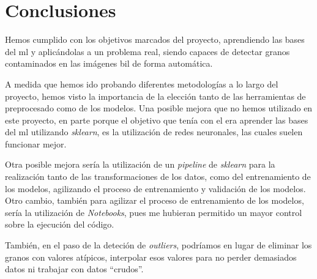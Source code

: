 \section{Conclusiones}

Hemos cumplido con los objetivos marcados del proyecto, aprendiendo las bases del \gls{ml} y aplicándolas a un problema real, siendo capaces de detectar granos contaminados en las imágenes \gls{bil} de forma automática.

A medida que hemos ido probando diferentes metodologías a lo largo del proyecto, hemos visto la importancia de la elección tanto de las herramientas de preprocesado como de los modelos.
Una posible mejora que no hemos utilizado en este proyecto, en parte porque el objetivo que tenía con el era aprender las bases del \gls{ml} utilizando \textit{sklearn}, es la utilización de redes neuronales, las cuales suelen funcionar mejor.

Otra posible mejora sería la utilización de un \textit{pipeline} de \textit{sklearn} para la realización tanto de las transformaciones de los datos, como del entrenamiento de los modelos, agilizando el proceso de entrenamiento y validación de los modelos. Otro cambio, también para agilizar el proceso de entrenamiento de los modelos, sería la utilización de \textit{Notebooks}, pues me hubieran permitido un mayor control sobre la ejecución del código.

También, en el paso de la deteción de \textit{outliers}, podríamos en lugar de eliminar los granos con valores atípicos, interpolar esos valores para no perder demasiados datos ni trabajar con datos ``crudos''.